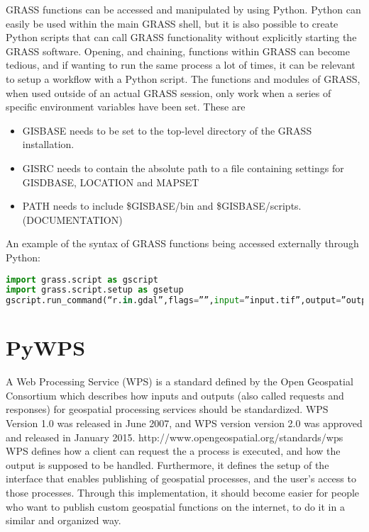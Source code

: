 GRASS functions can be accessed and manipulated by using Python. Python can easily be used within the main GRASS shell, but it is also possible to create Python scripts that can call GRASS functionality without explicitly starting the GRASS software.
Opening, and chaining, functions within GRASS can become tedious, and if wanting to run the same process a lot of times, it can be relevant to setup a workflow with a Python script.
The functions and modules of GRASS, when used outside of an actual GRASS session, only work when a series of specific environment variables have been set. 
These are
\begin{itemize}
\item GISBASE needs to be set to the top-level directory of the GRASS installation. 
\item GISRC needs to contain the absolute path to a file containing settings for GISDBASE, LOCATION and MAPSET 
\item PATH needs to include \$GISBASE/bin and \$GISBASE/scripts. (DOCUMENTATION)
\end{itemize}

An example of the syntax of GRASS functions being accessed externally through Python:

\begin{lstlisting}[language=Python]
import grass.script as gscript
import grass.script.setup as gsetup
gscript.run_command(“r.in.gdal”,flags=””,input=”input.tif”,output=”output”
\end{lstlisting}


\section{PyWPS}

A Web Processing Service (WPS) is a standard defined by the Open Geospatial Consortium which describes how inputs and outputs (also called requests and responses) for geospatial processing services should be standardized. 
WPS Version 1.0 was released in June 2007, and WPS version version 2.0 was approved and released in January 2015. http://www.opengeospatial.org/standards/wps \\
WPS defines how a client can request the a process is executed, and how the output is supposed to be handled. Furthermore, it defines the setup of the interface that enables publishing of geospatial processes, and the user's access to those processes. Through this implementation, it should become easier for people who want to publish custom geospatial functions on the internet, to do it in a similar and organized way. \\

